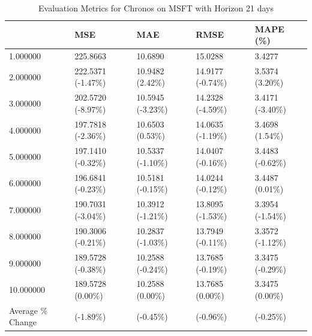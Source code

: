 \begin{table}
\caption{Evaluation Metrics for Chronos on MSFT with Horizon 21 days}
\label{tab:chronos_base_MSFT_h21_metrics}
\begin{tabular}{lllll}
\toprule
 & MSE & MAE & RMSE & MAPE (\%) \\
\midrule
1.000000 & 225.8663 & 10.6890 & 15.0288 & 3.4277 \\
2.000000 & 222.5371 (-1.47\%) & 10.9482 (2.42\%) & 14.9177 (-0.74\%) & 3.5374 (3.20\%) \\
3.000000 & 202.5720 (-8.97\%) & 10.5945 (-3.23\%) & 14.2328 (-4.59\%) & 3.4171 (-3.40\%) \\
4.000000 & 197.7818 (-2.36\%) & 10.6503 (0.53\%) & 14.0635 (-1.19\%) & 3.4698 (1.54\%) \\
5.000000 & 197.1410 (-0.32\%) & 10.5337 (-1.10\%) & 14.0407 (-0.16\%) & 3.4483 (-0.62\%) \\
6.000000 & 196.6841 (-0.23\%) & 10.5181 (-0.15\%) & 14.0244 (-0.12\%) & 3.4487 (0.01\%) \\
7.000000 & 190.7031 (-3.04\%) & 10.3912 (-1.21\%) & 13.8095 (-1.53\%) & 3.3954 (-1.54\%) \\
8.000000 & 190.3006 (-0.21\%) & 10.2837 (-1.03\%) & 13.7949 (-0.11\%) & 3.3572 (-1.12\%) \\
9.000000 & 189.5728 (-0.38\%) & 10.2588 (-0.24\%) & 13.7685 (-0.19\%) & 3.3475 (-0.29\%) \\
10.000000 & 189.5728 (0.00\%) & 10.2588 (0.00\%) & 13.7685 (0.00\%) & 3.3475 (0.00\%) \\
Average \% Change & (-1.89\%) & (-0.45\%) & (-0.96\%) & (-0.25\%) \\
\bottomrule
\end{tabular}
\end{table}
